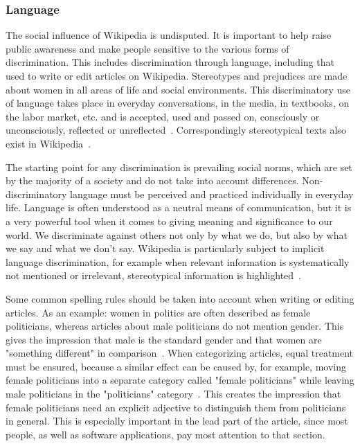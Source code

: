 \documentclass[a4paper, 11pt]{article}
\begin{document}
\subsubsection{Language} \label{sec:gender-gap-wikipedia:language}
The social influence of Wikipedia is undisputed. It is important to help raise public awareness and make people sensitive to the various forms of discrimination. This includes discrimination through language, including that used to write or edit articles on Wikipedia. Stereotypes and prejudices are made about women in all areas of life and social environments. This discriminatory use of language takes place in everyday conversations, in the media, in textbooks, on the labor market, etc. and is accepted, used and passed on, consciously or unconsciously, reflected or unreflected~\cite{peters2017bbc}. Correspondingly stereotypical texts also exist in Wikipedia~\cite{graells2015first}.

The starting point for any discrimination is prevailing social norms, which are set by the majority of a society and do not take into account differences. Non-discriminatory language must be perceived and practiced individually in everyday life. Language is often understood as a neutral means of communication, but it is a very powerful tool when it comes to giving meaning and significance to our world. We discriminate against others not only by what we do, but also by what we say and what we don't say. Wikipedia is particularly subject to implicit language discrimination, for example when relevant information is systematically not mentioned or irrelevant, stereotypical information is highlighted~\cite{wagner2016women}.

Some common spelling rules should be taken into account when writing or editing articles. As an example: women in politics are often described as female politicians, whereas articles about male politicians do not mention gender. This gives the impression that male is the standard gender and that women are "something different" in comparison~\cite{wagner2016women}. When categorizing articles, equal treatment must be ensured, because a similar effect can be caused by, for example, moving female politicians into a separate category called "female politicians" while leaving male politicians in the "politicians" category~\cite{flood2013guardian}. This creates the impression that female politicians need an explicit adjective to distinguish them from politicians in general. This is especially important in the lead part of the article, since most people, as well as software applications, pay most attention to that section.
\end{document}
